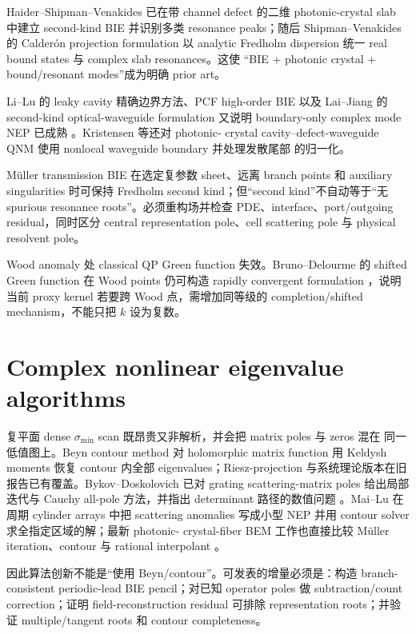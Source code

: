 \documentclass[UTF8,11pt,fontset=none]{ctexart}
\begin{document}
Haider--Shipman--Venakides 已在带 channel defect 的二维 photonic-crystal slab 中建立
second-kind BIE 并识别多类 resonance peaks\cite{HaiderShipmanVenakides2002}；随后
Shipman--Venakides 的 Calderón projection formulation 以 analytic Fredholm dispersion
统一 real bound states 与 complex slab resonances\cite{ShipmanVenakides2003}。这使
“BIE + photonic crystal + bound/resonant modes”成为明确 prior art。

Li--Lu 的 leaky cavity 精确边界方法、PCF high-order BIE 以及 Lai--Jiang 的 second-kind
optical-waveguide formulation 又说明 boundary-only complex mode NEP 已成熟
\cite{LiLu2009LeakyCavities,LuLu2012PCF,LaiJiang2018}。Kristensen 等还对 photonic-
crystal cavity--defect-waveguide QNM 使用 nonlocal waveguide boundary 并处理发散尾部
的归一化\cite{KristensenEtAl2014}。

Müller transmission BIE 在选定复参数 sheet、远离 branch points 和 auxiliary
singularities 时可保持 Fredholm second kind；但“second kind”不自动等于“无 spurious
resonance roots”。必须重构场并检查 PDE、interface、port/outgoing residual，同时区分
central representation pole、cell scattering pole 与 physical resolvent pole。

Wood anomaly 处 classical QP Green function 失效。Bruno--Delourme 的 shifted Green
function 在 Wood points 仍可构造 rapidly convergent formulation
\cite{BrunoDelourme2014}，说明当前 proxy kernel 若要跨 Wood 点，需增加同等级的
completion/shifted mechanism，不能只把 \(k\) 设为复数。

\section{Complex nonlinear eigenvalue algorithms}

复平面 dense \(\sigma_{\min}\) scan 既昂贵又非解析，并会把 matrix poles 与 zeros 混在
同一低值图上。Beyn contour method 对 holomorphic matrix function 用 Keldysh moments
恢复 contour 内全部 eigenvalues\cite{Beyn2012}；Riesz-projection 与系统理论版本在旧
报告已有覆盖。Bykov--Doskolovich 已对 grating scattering-matrix poles 给出局部迭代与
Cauchy all-pole 方法，并指出 determinant 路径的数值问题
\cite{BykovDoskolovich2013}。Mai--Lu 在周期 cylinder arrays 中把 scattering anomalies
写成小型 NEP 并用 contour solver 求全指定区域的解\cite{MaiLu2022}；最新 photonic-
crystal-fiber BEM 工作也直接比较 Müller iteration、contour 与 rational interpolant
\cite{PerrusselPoirier2024}。

因此算法创新不能是“使用 Beyn/contour”。可发表的增量必须是：构造 branch-consistent
periodic-lead BIE pencil；对已知 operator poles 做 subtraction/count correction；证明
field-reconstruction residual 可排除 representation roots；并验证 multiple/tangent roots
和 contour completeness。
\end{document}
